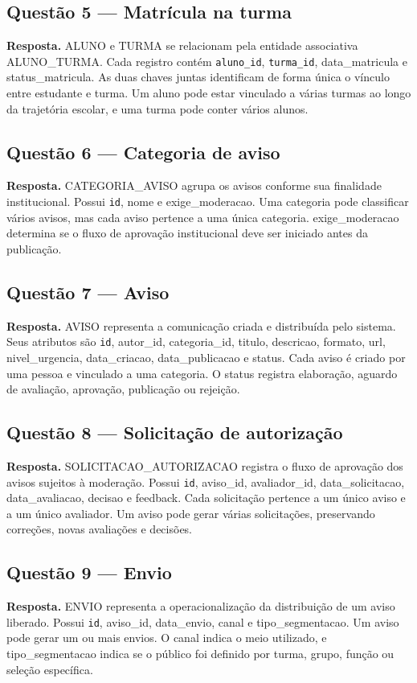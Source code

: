 \subsection{Questão 5 — Matrícula na turma}
\textbf{Resposta.} ALUNO e TURMA se relacionam pela entidade associativa ALUNO\_TURMA.
Cada registro contém \texttt{aluno\_id}, \texttt{turma\_id}, data\_matricula e status\_matricula.
As duas chaves juntas identificam de forma única o vínculo entre estudante e turma.
Um aluno pode estar vinculado a várias turmas ao longo da trajetória escolar, e uma turma
pode conter vários alunos.

\subsection{Questão 6 — Categoria de aviso}
\textbf{Resposta.} CATEGORIA\_AVISO agrupa os avisos conforme sua finalidade institucional.
Possui \texttt{id}, nome e exige\_moderacao. Uma categoria pode classificar vários avisos, mas
cada aviso pertence a uma única categoria. exige\_moderacao determina se o fluxo de aprovação
institucional deve ser iniciado antes da publicação.

\subsection{Questão 7 — Aviso}
\textbf{Resposta.} AVISO representa a comunicação criada e distribuída pelo sistema. Seus atributos
são \texttt{id}, autor\_id, categoria\_id, titulo, descricao, formato, url, nivel\_urgencia,
data\_criacao, data\_publicacao e status. Cada aviso é criado por uma pessoa e vinculado a uma
categoria. O status registra elaboração, aguardo de avaliação, aprovação, publicação ou rejeição.

\subsection{Questão 8 — Solicitação de autorização}
\textbf{Resposta.} SOLICITACAO\_AUTORIZACAO registra o fluxo de aprovação dos avisos sujeitos à
moderação. Possui \texttt{id}, aviso\_id, avaliador\_id, data\_solicitacao, data\_avaliacao,
decisao e feedback. Cada solicitação pertence a um único aviso e a um único avaliador.
Um aviso pode gerar várias solicitações, preservando correções, novas avaliações e decisões.

\subsection{Questão 9 — Envio}
\textbf{Resposta.} ENVIO representa a operacionalização da distribuição de um aviso liberado.
Possui \texttt{id}, aviso\_id, data\_envio, canal e tipo\_segmentacao. Um aviso pode gerar
um ou mais envios. O canal indica o meio utilizado, e tipo\_segmentacao indica se o público foi
definido por turma, grupo, função ou seleção específica.

